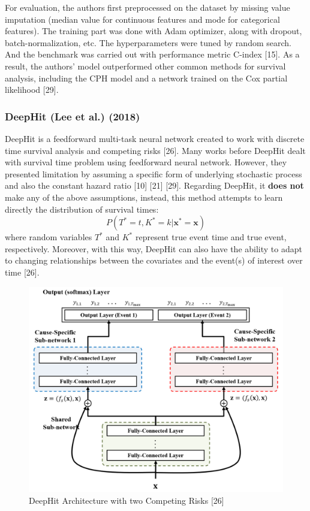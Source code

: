 \documentclass[
]{article}
\begin{document}
For evaluation, the authors first preprocessed on the dataset by missing value imputation (median value for continuous features and mode for categorical features). The training part was done with Adam optimizer, along with dropout, batch-normalization, etc. The hyperparameters were tuned by random search. And the benchmark was carried out with performance metric C-index {[}15{]}. As a result, the authors' model outperformed other common methods for survival analysis, including the CPH model and a network trained on the Cox partial likelihood {[}29{]}.

\hypertarget{deephit-lee-et-al.-2018}{%
\subsubsection{DeepHit (Lee et al.) (2018)}\label{deephit-lee-et-al.-2018}}

DeepHit is a feedforward multi-task neural network created to work with discrete time survival analysis and competing risks {[}26{]}. Many works before DeepHit dealt with survival time problem using feedforward neural network. However, they presented limitation by assuming a specific form of underlying stochastic process and also the constant hazard ratio {[}10{]} {[}21{]} {[}29{]}. Regarding DeepHit, it \textbf{does not} make any of the above assumptions, instead, this method attempts to learn directly the distribution of survival times:
\begin{equation}
P(T^* = t, K^* = k|\mathbf{x^*}=\mathbf{x})
\end{equation}
where random variables \(T^*\) and \(K^*\) represent true event time and true event, respectively. Moreover, with this way, DeepHit can also have the ability to adapt to changing relationships between the covariates and the event(s) of interest over time {[}26{]}.



\begin{figure}

{\centering \includegraphics[width=0.7\linewidth]{deephit-architecture-with-two-competing-risks} 

}

\caption{DeepHit Architecture with two Competing Risks {[}26{]}}\label{fig:deephit-architecture}
\end{figure}
\end{document}
